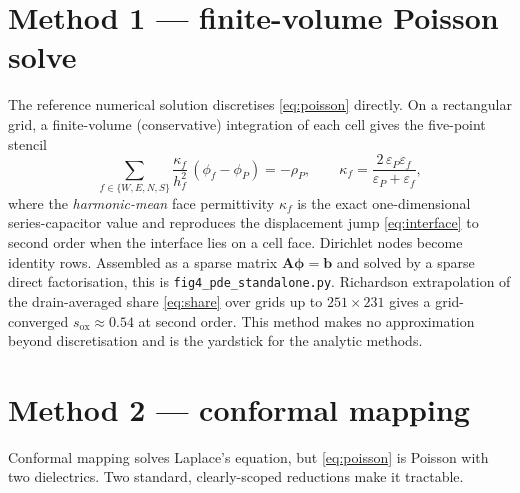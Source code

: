\documentclass[11pt]{article}
\begin{document}
\section{Method 1 --- finite-volume Poisson solve}
The reference numerical solution discretises \eqref{eq:poisson} directly. On a
rectangular grid, a finite-volume (conservative) integration of each cell gives the
five-point stencil
\begin{equation}
\sum_{f\in\{W,E,N,S\}}\frac{\kappa_{f}}{h_{f}^{2}}\,(\phi_{f}-\phi_{P})
 = -\rho_{P},
\qquad
\kappa_{f}=\frac{2\,\varepsilon_{P}\varepsilon_{f}}{\varepsilon_{P}+\varepsilon_{f}},
\label{eq:fv}
\end{equation}
where the \emph{harmonic-mean} face permittivity $\kappa_{f}$ is the exact
one-dimensional series-capacitor value and reproduces the displacement jump
\eqref{eq:interface} to second order when the interface lies on a cell face.
Dirichlet nodes become identity rows. Assembled as a sparse matrix
$\mathbf{A}\boldsymbol{\phi}=\mathbf{b}$ and solved by a sparse direct factorisation,
this is \texttt{fig4\_pde\_standalone.py}. Richardson extrapolation of the
drain-averaged share \eqref{eq:share} over grids up to $251\times231$ gives a
grid-converged $s_{\mathrm{ox}}\approx0.54$ at second order. This method makes no
approximation beyond discretisation and is the yardstick for the analytic methods.

\section{Method 2 --- conformal mapping}
Conformal mapping solves Laplace's equation, but \eqref{eq:poisson} is Poisson with
two dielectrics. Two standard, clearly-scoped reductions make it tractable.
\end{document}
